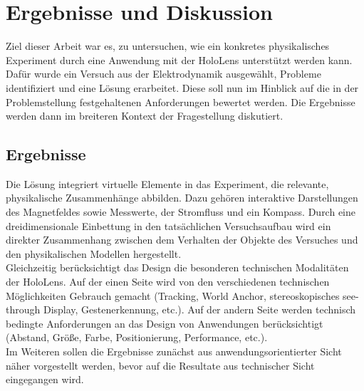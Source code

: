 \section{Ergebnisse und Diskussion}
\label{sec-6}

Ziel dieser Arbeit war es, zu untersuchen, wie ein konkretes physikalisches Experiment durch eine Anwendung mit der HoloLens unterstützt werden kann. Dafür wurde ein Versuch aus der Elektrodynamik ausgewählt, Probleme identifiziert und eine Lösung erarbeitet. Diese soll nun im Hinblick auf die in der Problemstellung festgehaltenen Anforderungen bewertet werden. Die Ergebnisse werden dann im breiteren Kontext der Fragestellung diskutiert.

\subsection{Ergebnisse}
 Die Lösung integriert virtuelle Elemente in das Experiment, die relevante, physikalische Zusammenhänge abbilden. Dazu gehören interaktive Darstellungen des Magnetfeldes sowie Messwerte, der Stromfluss und ein Kompass. Durch eine dreidimensionale Einbettung in den tatsächlichen Versuchsaufbau wird ein direkter Zusammenhang zwischen dem Verhalten der Objekte des Versuches und den physikalischen Modellen hergestellt.\\
 \noindent\hspace*{5mm}
 Gleichzeitig berücksichtigt das Design die besonderen technischen Modalitäten der HoloLens. Auf der einen Seite wird von den verschiedenen technischen Möglichkeiten Gebrauch gemacht (Tracking, World Anchor, stereoskopisches see-through Display, Gestenerkennung, etc.). Auf der andern Seite werden technisch bedingte Anforderungen an das Design von Anwendungen berücksichtigt (Abstand, Größe, Farbe, Positionierung, Performance, etc.).\\
 \noindent\hspace*{5mm}
 Im Weiteren sollen die Ergebnisse zunächst aus anwendungsorientierter Sicht näher vorgestellt werden, bevor auf die Resultate aus technischer Sicht eingegangen wird.
 
